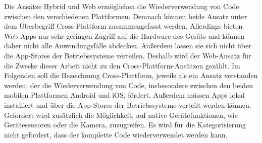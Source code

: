 Die Ansätze Hybrid und Web ermöglichen die Wiederverwendung von Code zwischen den verschiedenen Plattformen.
Demnach können beide Ansatz unter dem Überbegriff Cross-Plattform zusammengefasst werden.
Allerdings bieten Web-Apps nur sehr geringen Zugriff auf die Hardware des Geräts und können daher nicht alle Anwendungsfälle abdecken.
Außerdem lassen sie sich nicht über die App-Stores der Betriebssysteme verteilen.
Deshalb wird der Web-Ansatz für die Zwecke dieser Arbeit nicht zu den Cross-Plattform-Ansätzen gezählt.
Im Folgenden soll die Bezeichnung Cross-Plattform, jeweils als ein Ansatz verstanden werden, der die Wiederverwendung von Code, insbesondere zwischen den beiden mobilen Plattformen Android und iOS, fördert.
Außerdem müssen Apps lokal installiert und über die App-Stores der Betriebssysteme verteilt werden können.
Gefordert wird zusätzlich die Möglichkeit, auf native Gerätefunktionen, wie Gerätesensoren oder die Kamera, zuzugreifen.
Es wird für die Kategorisierung nicht gefordert, dass der komplette Code wiederverwendet werden kann.

